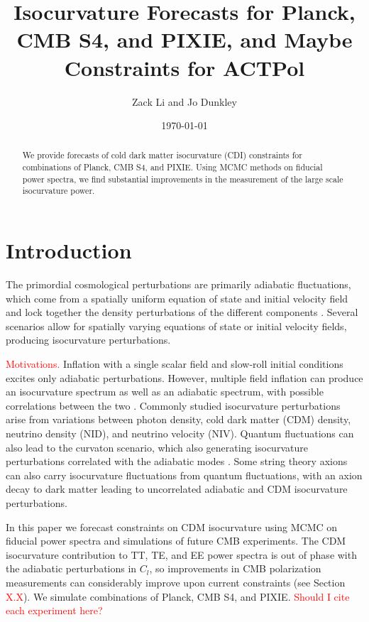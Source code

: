 \documentclass{emulateapj}
\newcommand\writingnote[1]{\textcolor{red}{#1}}
\begin{document}
\title{Isocurvature Forecasts for Planck, CMB S4, and PIXIE, and Maybe Constraints for ACTPol}
\author{Zack Li and Jo Dunkley}
\date{\today}
{}


\begin{abstract}
We provide forecasts of cold dark matter isocurvature (CDI) constraints for combinations of Planck, CMB S4, and PIXIE. Using MCMC methods on fiducial power spectra, we find substantial improvements in the measurement of the large scale isocurvature power.
\end{abstract}

\section{Introduction}

The primordial cosmological perturbations are primarily adiabatic fluctuations, which come from a spatially uniform equation of state and initial velocity field and lock together the density perturbations of the different components \citep{planckXXII:2013}.  Several scenarios allow for spatially varying equations of state or initial velocity fields, producing isocurvature perturbations.

\writingnote{Motivations.}
Inflation with a single scalar field and slow-roll initial conditions excites only adiabatic perturbations. However, multiple field inflation can produce an isocurvature spectrum as well as an adiabatic spectrum, with possible correlations between the two \citep{langlois:1999}. Commonly studied isocurvature perturbations arise from variations between photon density, cold dark matter (CDM) density, neutrino density (NID), and neutrino velocity (NIV). Quantum fluctuations can also lead to the curvaton scenario, which also generating isocurvature perturbations correlated with the adiabatic modes \citep{baumann/etal:2009}. Some string theory axions can also carry isocurvature fluctuations from quantum fluctuations, with an axion decay to dark matter leading to uncorrelated adiabatic and CDM isocurvature perturbations.

In this paper we forecast constraints on CDM isocurvature using MCMC on fiducial power spectra and simulations of future CMB experiments. The CDM isocurvature contribution to TT, TE, and EE power spectra is out of phase with the adiabatic perturbations in $C_l$, so improvements in CMB polarization measurements can considerably improve upon current constraints (see Section \writingnote{X.X}). We simulate combinations of Planck, CMB S4, and PIXIE. \writingnote{Should I cite each experiment here?}
\end{document}
